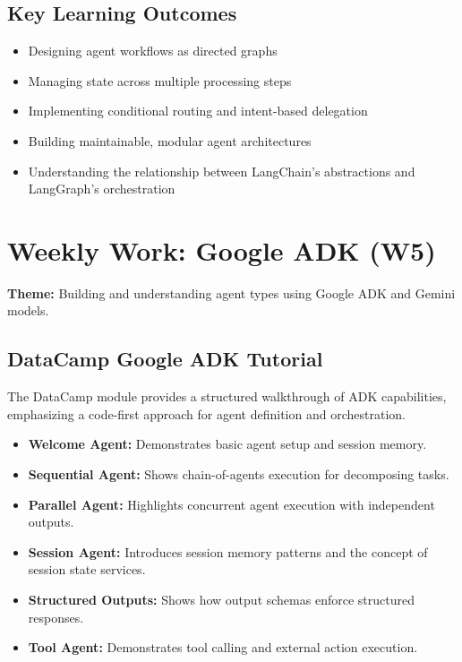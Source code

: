 \documentclass[11pt]{article}
\begin{document}
\subsection{Key Learning Outcomes}
\begin{itemize}[leftmargin=2em]
    \item Designing agent workflows as directed graphs
    \item Managing state across multiple processing steps
    \item Implementing conditional routing and intent-based delegation
    \item Building maintainable, modular agent architectures
    \item Understanding the relationship between LangChain's abstractions and LangGraph's orchestration
\end{itemize}

\section{Weekly Work: Google ADK (W5)}
\textbf{Theme:} Building and understanding agent types using Google ADK and Gemini models.

\subsection{DataCamp Google ADK Tutorial}
The DataCamp module provides a structured walkthrough of ADK capabilities, emphasizing a code-first approach for agent definition and orchestration.

\begin{itemize}[leftmargin=2em]
    \item \textbf{Welcome Agent:} Demonstrates basic agent setup and session memory.
    \item \textbf{Sequential Agent:} Shows chain-of-agents execution for decomposing tasks.
    \item \textbf{Parallel Agent:} Highlights concurrent agent execution with independent outputs.
    \item \textbf{Session Agent:} Introduces session memory patterns and the concept of session state services.
    \item \textbf{Structured Outputs:} Shows how output schemas enforce structured responses.
    \item \textbf{Tool Agent:} Demonstrates tool calling and external action execution.
\end{itemize}
\end{document}
